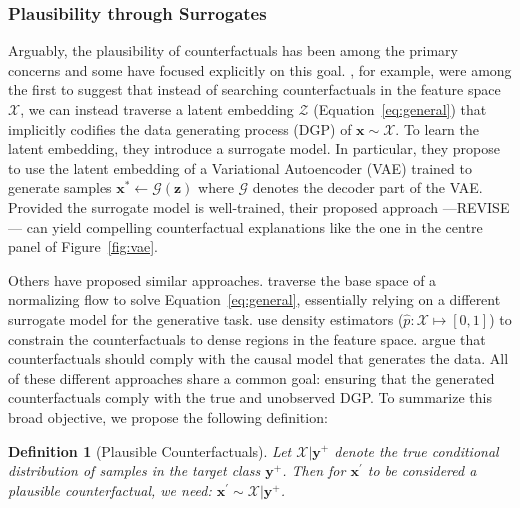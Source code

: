 \documentclass{article}
\newtheorem{definition}{Definition}[section]
\begin{document}
\subsubsection{Plausibility through Surrogates}

Arguably, the plausibility of counterfactuals has been among the primary concerns and some have focused explicitly on this goal. \citet{joshi2019realistic}, for example, were among the first to suggest that instead of searching counterfactuals in the feature space $\mathcal{X}$, we can instead traverse a latent embedding $\mathcal{Z}$ (Equation~\ref{eq:general}) that implicitly codifies the data generating process (DGP) of $\mathbf{x}\sim\mathcal{X}$. To learn the latent embedding, they introduce a surrogate model. In particular, they propose to use the latent embedding of a Variational Autoencoder (VAE) trained to generate samples $\mathbf{x}^* \leftarrow \mathcal{G}(\mathbf{z})$ where $\mathcal{G}$ denotes the decoder part of the VAE. Provided the surrogate model is well-trained, their proposed approach ---REVISE--- can yield compelling counterfactual explanations like the one in the centre panel of Figure~\ref{fig:vae}. 

Others have proposed similar approaches. \citet{dombrowski2021diffeomorphic} traverse the base space of a normalizing flow to solve Equation~\ref{eq:general}, essentially relying on a different surrogate model for the generative task. \citet{poyiadzi2020face} use density estimators ($\hat{p}: \mathcal{X} \mapsto [0,1]$) to constrain the counterfactuals to dense regions in the feature space. \citet{karimi2021algorithmic} argue that counterfactuals should comply with the causal model that generates the data. All of these different approaches share a common goal: ensuring that the generated counterfactuals comply with the true and unobserved DGP. To summarize this broad objective, we propose the following definition:

\begin{definition}[Plausible Counterfactuals]
  \label{def:plausible}
  Let $\mathcal{X}|\mathbf{y}^+$ denote the true conditional distribution of samples in the target class $\mathbf{y}^+$. Then for $\mathbf{x}^{\prime}$ to be considered a plausible counterfactual, we need: $\mathbf{x}^{\prime} \sim \mathcal{X}|\mathbf{y}^+$.
\end{definition}
\end{document}

